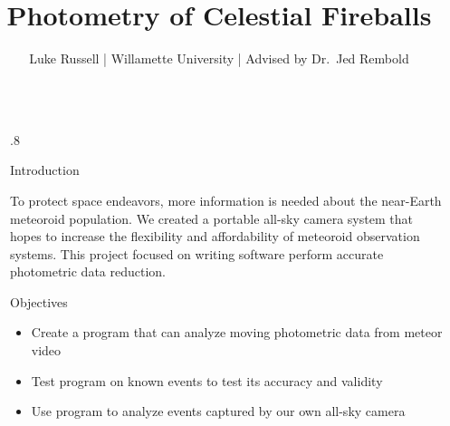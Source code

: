 \documentclass[final]{beamer}
\title{Photometry of Celestial Fireballs} %
\author{Luke Russell | Willamette University | Advised by Dr.~Jed Rembold} %
\newlength{\sepwid}
\newlength{\twocolwid}
\begin{document}

\setlength{\belowcaptionskip}{0ex} %
\setlength\belowdisplayshortskip{2ex} %

\begin{frame}[t] %

\begin{columns}[t] %

\begin{column}{\sepwid}\end{column} %

\begin{column}{.8\twocolwid} %



\begin{block}{Introduction}

To protect space endeavors, more information is needed about the near-Earth meteoroid population. We created a portable all-sky camera system that hopes to increase the flexibility and affordability of meteoroid observation systems. This project focused on writing software perform accurate photometric data reduction.

\end{block}

\begin{alertblock}{Objectives}

 \begin{itemize}
\item Create a program that can analyze moving photometric data from meteor video
\item Test program on known events to test its accuracy and validity
\item Use program to analyze events captured by our own all-sky camera
\end{itemize}


\end{alertblock}
\end{column}
\end{columns}
\end{frame}
\end{document}
